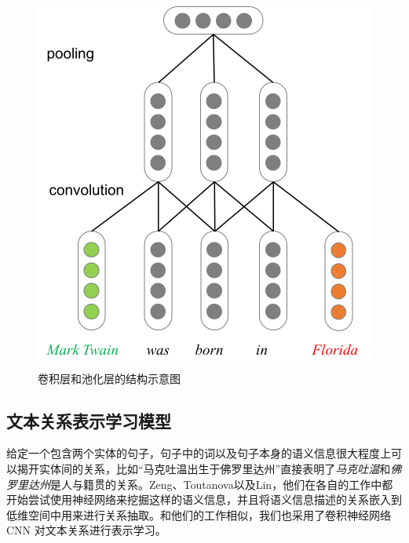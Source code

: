 \begin{figure}[h]
\centering
\includegraphics[width=0.7\columnwidth]{figures/ch3/cnn_concrete.png}
\caption{卷积层和池化层的结构示意图}
\label{fig:conv_pooling}
\end{figure}





\subsection{文本关系表示学习模型}
\label{sec:relation}

给定一个包含两个实体的句子，句子中的词以及句子本身的语义信息很大程度上可以揭开实体间的关系，比如``马克吐温出生于佛罗里达州''直接表明了\emph{马克吐温}和\emph{佛罗里达州}是人与籍贯的关系。Zeng、Toutanova以及Lin\cite{zeng2014relation,toutanova2015representing,lin2016neural}，他们在各自的工作中都开始尝试使用神经网络来挖掘这样的语义信息，并且将语义信息描述的关系嵌入到低维空间中用来进行关系抽取。和他们的工作\cite{zeng2014relation,toutanova2015representing,lin2016neural}相似，我们也采用了卷积神经网络 CNN 对文本关系进行表示学习。

